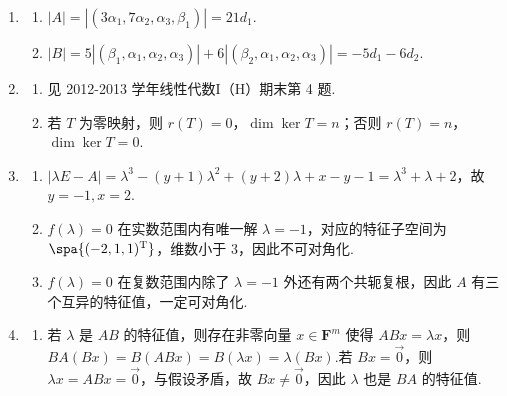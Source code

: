 \begin{enumerate}
\begin{enumerate}
        \item 由条件 $\langle x, v_i \rangle = (-1)^i, \langle y, v_i \rangle = 1, 1\leqslant i \leqslant n$，故
        \[
            \cos\theta = \frac{\langle x, y \rangle}{\|x\| \|y\|} = \frac{\sum_{i=1}^n \langle x, v_i \rangle \langle y, v_i \rangle}{\sqrt{\sum_{i=1}^n \langle x, v_i \rangle^2} \sqrt{\sum_{i=1}^n \langle y, v_i \rangle^2}} = \frac{\sum_{i=1}^n (-1)^i}{n} = \frac{-1+(-1)^n}{2n}.
        \]
        当 $n$ 为偶数时，$\cos\theta = 0$，即 $x \perp y$；

        当 $n$ 为奇数时，$\cos\theta = -\dfrac{1}{n}$，二者不正交.
    \end{enumerate}

    \item \begin{enumerate}
        \item $|A|=|(3\alpha_1, 7\alpha_2, \alpha_3, \beta_1)| = 21 d_1$.
        \item $|B| = 5|(\beta_1, \alpha_1, \alpha_2, \alpha_3)| + 6|(\beta_2, \alpha_1, \alpha_2, \alpha_3)| = -5d_1 - 6d_2$.
    \end{enumerate}

    \item \begin{enumerate}
        \item 见 2012-2013 学年线性代数I（H）期末第 4 题.

        \item 若 $T$ 为零映射，则 $r(T)=0$，$\dim\ker T = n$；否则 $r(T)=n$，$\dim\ker T = 0$.
    \end{enumerate}

    \item \begin{enumerate}
        \item $|\lambda E - A| = \lambda^3 - (y+1)\lambda^2 + (y+2)\lambda + x-y-1 = \lambda^3 + \lambda + 2$，故 $y=-1, x=2$.
        \item $f(\lambda)=0$ 在实数范围内有唯一解 $\lambda=-1$，对应的特征子空间为 $\spa\{(-2,1,1)^\mathrm{T}\}$，维数小于 $3$，因此不可对角化.
        \item $f(\lambda)=0$ 在复数范围内除了 $\lambda=-1$ 外还有两个共轭复根，因此 $A$ 有三个互异的特征值，一定可对角化.
    \end{enumerate}

    \item \begin{enumerate}
        \item 若 $\lambda$ 是 $AB$ 的特征值，则存在非零向量 $x \in \mathbf{F}^m$ 使得 $ABx = \lambda x$，则 $BA(Bx) = B(ABx) = B(\lambda x) = \lambda (Bx)$.若 $Bx = \vec{0}$，则 $\lambda x = ABx = \vec{0}$，与假设矛盾，故 $Bx \neq \vec{0}$，因此 $\lambda$ 也是 $BA$ 的特征值.


\end{enumerate}
\end{enumerate}
